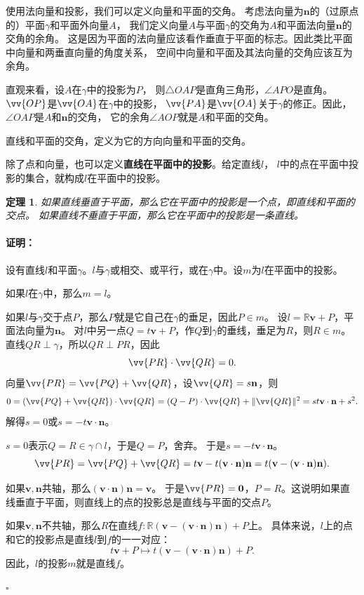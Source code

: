 \documentclass[12pt,UTF8]{ctexbook}
\newtheorem{tm}{定理}[section]
\renewenvironment{proof}{\paragraph{\textbf{证明：}}}{\hfill$\square$}
\begin{document}
使用法向量和投影，我们可以定义向量和平面的交角。
考虑法向量为$\mathbf{n}$的（过原点的）平面$\gamma$和平面外向量$A$，
我们定义向量$A$与平面$\gamma$的交角为$A$和平面法向量$\mathbf{n}$的交角的余角。
这是因为平面的法向量应该看作垂直于平面的标志。因此类比平面中向量和两垂直向量的角度关系，
空间中向量和平面及其法向量的交角应该互为余角。

直观来看，设$A$在$\gamma$中的投影为$P$，
则$\triangle OAP$是直角三角形，$\angle APO$是直角。$\vv{OP}$是$\vv{OA}$在$\gamma$中的投影，
$\vv{PA}$是$\vv{OA}$关于$\gamma$的修正。因此，$\angle OAP$是$A$和$\mathbf{n}$的交角，
它的余角$\angle AOP$就是$A$和平面的交角。

直线和平面的交角，定义为它的方向向量和平面的交角。

除了点和向量，也可以定义\textbf{直线在平面中的投影}。给定直线$l$，
$l$中的点在平面中投影的集合，就构成$l$在平面中的投影。
\begin{tm}\label{tm:1-3-55}
    如果直线垂直于平面，那么它在平面中的投影是一个点，即直线和平面的交点。
    如果直线不垂直于平面，那么它在平面中的投影是一条直线。    
\end{tm}
\begin{proof}
    设有直线$l$和平面$\gamma$。$l$与$\gamma$或相交、或平行，或在$\gamma$中。设$m$为$l$在平面中的投影。

    如果$l$在$\gamma$中，那么$m=l$。

    如果$l$与$\gamma$交于点$P$，那么$P$就是它自己在$\gamma$的垂足，因此$P\in m$。
    设$l=\mathbb{R}\mathbf{v}+P$，平面法向量为$\mathbf{n}$。
    对$l$中另一点$Q = t\mathbf{v}+P$，作$Q$到$\gamma$的垂线，垂足为$R$，则$R\in m$。
    直线$QR\perp\gamma$，所以$QR\perp PR$，因此
    $$ \vv{PR}\cdot\vv{QR} = 0.$$
    向量$\vv{PR} = \vv{PQ} + \vv{QR}$，设$\vv{QR} = s\mathbf{n}$，则
    $$ 0 = (\vv{PQ} + \vv{QR})\cdot\vv{QR} = (Q - P) \cdot\vv{QR} + \|\vv{QR}\|^2 = st\mathbf{v}\cdot\mathbf{n} + s^2. $$
    解得$s=0$或$s = -t\mathbf{v}\cdot\mathbf{n}$。
    
    $s=0$表示$Q=R\in \gamma\cap l$，于是$Q=P$，舍弃。
    于是$s = -t\mathbf{v}\cdot\mathbf{n}$。
    $$\vv{PR} = \vv{PQ} + \vv{QR} = t\mathbf{v} -t(\mathbf{v}\cdot\mathbf{n})\mathbf{n} = t(\mathbf{v} - (\mathbf{v}\cdot\mathbf{n})\mathbf{n}). $$
    
    如果$\mathbf{v}, \mathbf{n}$共轴，那么$(\mathbf{v}\cdot\mathbf{n})\mathbf{n} = \mathbf{v}$。
    于是$\vv{PR} = \mathbf{0}$，$P = R$。这说明如果直线垂直于平面，则直线上的点的投影总是直线与平面的交点$P$。

    如果$\mathbf{v},\mathbf{n}$不共轴，那么$R$在直线$f:\mathbb{R}(\mathbf{v} - (\mathbf{v}\cdot\mathbf{n})\mathbf{n}) + P$上。
    具体来说，$l$上的点和它的投影点是直线$l$到$f$的一一对应：
    $$ t\mathbf{v}+P \mapsto t(\mathbf{v} - (\mathbf{v}\cdot\mathbf{n})\mathbf{n}) + P.$$
    因此，$l$的投影$m$就是直线$f$。
    
\end{proof}
\end{document}
